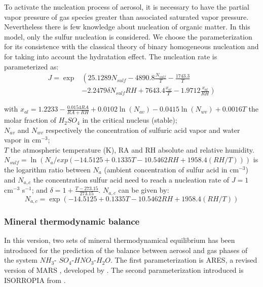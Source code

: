 To activate the nucleation process of aerosol, it is necessary to 
have
the partial vapor pressure of gas species greater than associated saturated 
vapor pressure.
Nevertheless  there is few knowledge about nucleation of organic matter. In this 
model, only the sulfur nucleation is considered. We choose the \citet{Kulmala1998} 
parameterization for its consistence with the classical theory of binary 
homogeneous
nucleation \citep{Wilemski1984} and for taking into account the hydratation 
effect.
The nucleation rate is parameterized as: 
\begin{equation}
\begin{split}
J = \exp & \left( 25.1289 N_{sulf}  - 4890.8 \frac{N_{sulf}}{T} -\frac{1743.3}{T} \right.  \\ 
& \left. -2.2479 \delta N_{sulf} RH + 7643.4 \frac{x_{al}}{T} - 1.9712 \frac{x_{al}}{RH} 
\right)
\end{split}
\label{nucleation}
\end{equation}

with  
$x_{al}=1.2233 - \frac{0.0154 RA}{RA+RH} + 0.0102 \ln(N_{av})-0.0415\ln(N_{wv}) 
+ 0.0016 T$ the molar fraction of $H_2SO_4$ in the critical nucleus (stable);\\
$N_{av}$ and $N_{wv}$ respectively the concentration  of sulfuric acid vapor and water vapor in 
cm$^{-3}$; \\
$T$ the atmospheric temperature (K), RA and RH absolute and relative humidity. 
$N_{sulf} = \ln\left(N_a / exp(-14.5125+0.1335T-10.5462 RH+1958.4(RH/T)) 
\right)$ 
is the logarithm ratio between $N_a$ (ambient concentration of sulfur acid in 
cm$^{-3}$) and $N_{a,c}$ the concentration sulfur acid need to reach a nucleation 
rate of $J= 1$ cm$^{-3}$ s$^{-1}$; 
and $\delta = 1 + \frac{T - 273.15}{273.15}$.
$N_{a,c}$ can be given by:
\begin{equation}
N_{a,c} = \exp (-14.5125 + 0.1335 T - 10.5462 RH + 1958.4 (RH/T)) 
\label{nac}
\end{equation}

\subsubsection*{Mineral thermodynamic balance}
In this version, two sets of mineral thermodynamical equilibrium has been 
introduced for 
the prediction of the balance between aerosol and gas phases of the  system $NH_3$-
$SO_4$-$HNO_3$-$H_2O$.
The first parameterization is ARES, a revised version of MARS \citep{Saxena1986}, 
developed by \citet{Binkowski1995}.
The second parameterization introduced is ISORROPIA from \citet{Nenes1998}. 

